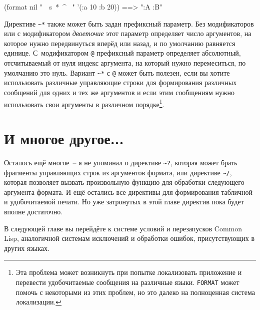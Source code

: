 \begin{myverb}
(format nil "~{~s~*~^ ~}" '(:a 10 :b 20)) ==> ":A :B"
\end{myverb}

Директиве \lstinline!~*! также может быть задан префиксный параметр. Без модификаторов или
с модификатором \textit{двоеточие} этот параметр определяет число аргументов, на которое
нужно передвинуться вперёд или назад, и по умолчанию равняется единице. С~модификатором
\lstinline!@! префиксный параметр определяет абсолютный, отсчитываемый от нуля индекс
аргумента, на который нужно перемеситься, по умолчанию это нуль. Вариант \lstinline!~*! с
\lstinline!@! может быть полезен, если вы хотите использовать различные управляющие строки
для формирования различных сообщений для одних и тех же аргументов и если этим сообщениям
нужно использовать свои аргументы в различном порядке\footnote{Эта проблема может
  возникнуть при попытке локализовать приложение и перевести удобочитаемые сообщения на
  различные языки. \lstinline{FORMAT} может помочь с некоторыми из этих проблем, но это далеко
  на полноценная система локализации.}.

\section{И многое другое...}

Осталось ещё многое~-- я не упоминал о директиве \lstinline!~?!, которая может брать
фрагменты управляющих строк из аргументов формата, или директиве \lstinline!~/!, которая
позволяет вызвать произвольную функцию для обработки следующего аргумента формата. И ещё
остались все директивы для формирования табличной и удобочитаемой печати. Но уже
затронутых в этой главе директив пока будет вполне достаточно.

В следующей главе вы перейдёте к системе условий и перезапусков Common Lisp, аналогичной системам
исключений и обработки ошибок, присутствующих в других языках.



